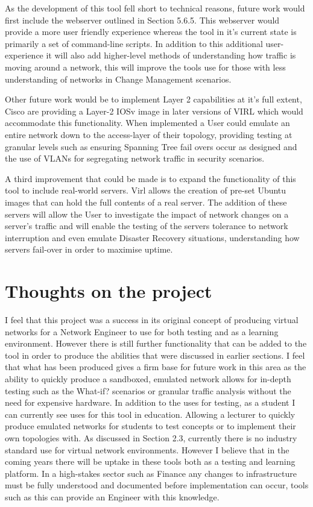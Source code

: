 \documentclass[11pt]{report}
\begin{document}
As the development of this tool fell short to technical reasons, future work would first include the webserver outlined in Section 5.6.5. This webserver would provide a more user friendly experience whereas the tool in it's current state is primarily a set of command-line scripts. In addition to this additional user-experience it will also add higher-level methods of understanding how traffic is moving around a network, this will improve the tools use for those with less understanding of networks in Change Management scenarios.

Other future work would be to implement Layer 2 capabilities at it's full extent, Cisco are providing a Layer-2 IOSv image in later versions of VIRL which would accommodate this functionality. When implemented a User could emulate an entire network down to the access-layer of their topology, providing testing at granular levels such as ensuring Spanning Tree fail overs occur as designed and the use of VLANs for segregating network traffic in security scenarios.

A third improvement that could be made is to expand the functionality of this tool to include real-world servers. Virl allows the creation of pre-set Ubuntu images that can hold the full contents of a real server. The addition of these servers will allow the User to investigate the impact of network changes on a server's traffic and will enable the testing of the servers tolerance to network interruption and even emulate Disaster Recovery situations, understanding how servers fail-over in order to maximise uptime.

\section{Thoughts on the project}

I feel that this project was a success in its original concept of producing virtual networks for a Network Engineer to use for both testing and as a learning environment. However there is still further functionality that can be added to the tool in order to produce the abilities that were discussed in earlier sections. I feel that what has been produced gives a firm base for future work in this area as the ability to quickly produce a sandboxed, emulated network allows for in-depth testing such as the What-if? scenarios or granular traffic analysis without the need for expensive hardware. In addition to the uses for testing, as a student I can currently see uses for this tool in education. Allowing a lecturer to quickly produce emulated networks for students to test concepts or to implement their own topologies with. As discussed in Section 2.3, currently there is no industry standard use for virtual network environments. However I believe that in the coming years there will be uptake in these tools both as a testing and learning platform. In a high-stakes sector such as Finance any changes to infrastructure must be fully understood and documented before implementation can occur, tools such as this can provide an Engineer with this knowledge.
\end{document}
